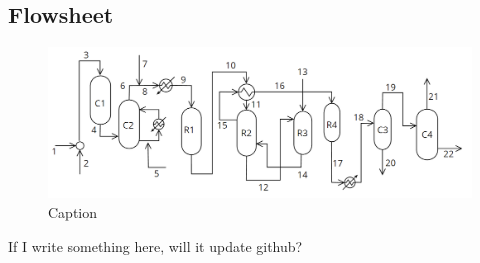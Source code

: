 \subsection{Flowsheet}
\begin{figure}[ht!]
    \centering
    \includegraphics[width = \textwidth]{Figure/FinalFlowsheet.PNG}
    \caption{Caption}
    \label{fig:my_label}
\end{figure}

If I write something here, will it update github?